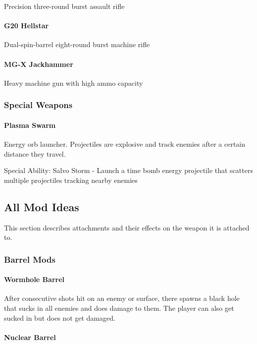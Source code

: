 \documentclass[../Main.tex]{subfiles}
\begin{document}
Precision three-round burst assault rifle

\paragraph{G20 Hellstar}

Dual-spin-barrel eight-round burst machine rifle

\paragraph{MG-X Jackhammer}

Heavy machine gun with high ammo capacity

\subsubsection{Special Weapons}

\paragraph{Plasma Swarm}

Energy orb launcher. Projectiles are explosive and track enemies after a certain distance they travel. 

Special Ability: Salvo Storm - Launch a time bomb energy projectile that scatters multiple projectiles tracking nearby enemies

\subsection{All Mod Ideas}

This section describes attachments and their effects on the weapon it is attached to.

\subsubsection{Barrel Mods}

\paragraph{Wormhole Barrel}

After consecutive shots hit on an enemy or surface, there spawns a black hole that sucks in all enemies and does damage to them. The player can also get sucked in but does not get damaged. 

\paragraph{Nuclear Barrel}
\end{document}
